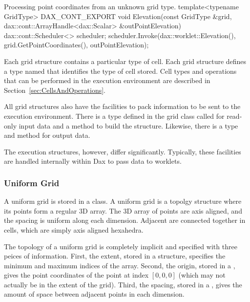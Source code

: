 \begin{daxexample}{Processing point coordinates from an unknown grid type.}
template<typename GridType>
DAX_CONT_EXPORT
void Elevation(const GridType &grid,
               dax::cont::ArrayHandle<dax::Scalar> &outPointElevation)
{
  dax::cont::Scheduler<> scheduler;
  scheduler.Invoke(dax::worklet::Elevation(),
                   grid.GetPointCoordinates(),
                   outPointElevation);
}
\end{daxexample}

Each grid structure contains a particular type of cell. Each grid structure
defines a type named   that identifies the
type of cell stored. Cell types and operations that can be performed in the
execution environment are described in
Section~\ref{sec:CellsAndOperations}.

All grid structures also have the facilities to pack information to be sent
to the execution environment. There is a type defined in the grid class
called  for read-only input data and
a  method to build the structure. Likewise, there
is a  type and
 method for output data.

The execution structures, however, differ significantly. Typically, these
facilities are handled internally within Dax to pass data to worklets.

\subsubsection{Uniform Grid}


A uniform grid is stored in a  class. A uniform grid
is a topolgy structure where its points form a regular 3D array. The 3D
array of points are axis aligned, and the spacing is uniform along each
dimension. Adjacent are connected together in  
cells, which are simply axis aligned hexahedra.

The topology of a uniform grid is completely implicit and specified with
three peices of information. First, the extent, stored in a 
structure, specifies the minimum and maximum indices of the array. Second,
the origin, stored in a , gives the point coordinates of the
point at index $[0,0,0]$ (which may not actually be in the extent of the
grid). Third, the spacing, stored in a , gives the amount of
space between adjacent points in each dimension.

